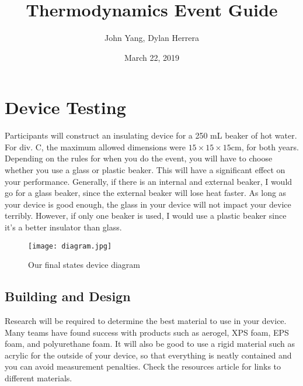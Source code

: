 \documentclass[twocolumn]{article}
\title{Thermodynamics Event Guide}
\author{John Yang, Dylan Herrera}
\date{March 22, 2019}
\begin{document}

\section{Device Testing}
Participants will construct an insulating device for a 250 mL beaker of hot water. For div. C, the maximum allowed dimensions were $15\times15\times15$cm, for both years. Depending on the rules for when you do the event, you will have to choose whether you use a glass or plastic beaker. This will have a significant effect on your performance. Generally, if there is an internal and external beaker, I would go for a glass beaker, since the external beaker will lose heat faster. As long as your device is good enough, the glass in your device will not impact your device terribly. However, if only one beaker is used, I would use a plastic beaker since it's a better insulator than glass. 

\begin{figure}[h]
\caption{Our final states device diagram}
\centering
\texttt{[image: diagram.jpg]}
\end{figure}

\subsection{Building and Design}
Research will be required to determine the best material to use in your device. Many teams have found success with products such as aerogel, XPS foam, EPS foam, and polyurethane foam. It will also be good to use a rigid material such as acrylic for the outside of your device, so that everything is neatly contained and you can avoid measurement penalties. Check the resources article for links to different materials. 
\end{document}

